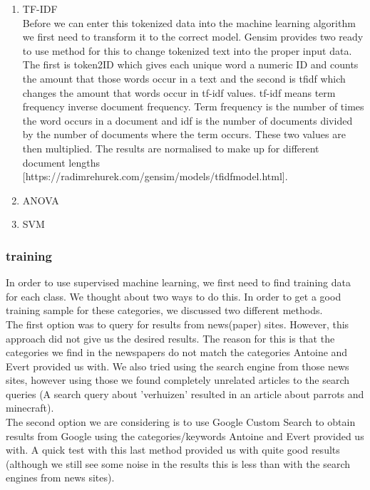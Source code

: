 \begin{enumerate}
\item TF-IDF \\ 
Before we can enter this tokenized data into the machine learning algorithm we first need to transform it to the correct model. Gensim provides two ready to use method for this to change tokenized text into the proper input data. The first is token2ID which gives each unique word a numeric ID and counts the amount that those words occur in a text and the second is tfidf which changes the amount that words occur in tf-idf values. tf-idf means term frequency inverse document frequency. Term frequency is the number of times the word occurs in a document and idf is the number of documents divided by the number of documents where the term occurs. These two values are then multiplied. The results are normalised to make up for different document lengths [https://radimrehurek.com/gensim/models/tfidfmodel.html].
\item ANOVA

\item SVM
\end{enumerate}

\subsubsection{training}
In order to use supervised machine learning, we first need to find training data for each class. We thought about two ways to do this. In order to get a good training sample for these categories, we discussed two different methods. \\

The first option was to query for results from news(paper) sites. However, this approach did not give us the desired results. The reason for this is that the categories we find in the newspapers do not match the categories Antoine and Evert provided us with. We also tried using the search engine from those news sites, however using those we found completely unrelated articles to the search queries (A search query about 'verhuizen' resulted in an article about parrots and minecraft).\\

The second option we are considering is to use Google Custom Search to obtain results from Google using the categories/keywords Antoine and Evert provided us with. A quick test with this last method provided us with quite good results (although we still see some noise in the results this is less than with the search engines from news sites).\\


